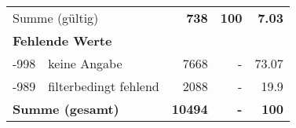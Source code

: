 \begin{longtable}{lXrrr}
     \midrule
     \multicolumn{2}{l}{Summe (gültig)} &
       \textbf{\num{738}} &
     \textbf{100} &
       \textbf{\num[round-mode=places,round-precision=2]{7,03}} \\
     \multicolumn{5}{l}{\textbf{Fehlende Werte}}\\
       -998 &
       keine Angabe &
         \num{7668} &
        - &
         \num[round-mode=places,round-precision=2]{73,07} \\
       -989 &
       filterbedingt fehlend &
         \num{2088} &
        - &
         \num[round-mode=places,round-precision=2]{19,9} \\
     \midrule
     \multicolumn{2}{l}{\textbf{Summe (gesamt)}} &
          \textbf{\num{10494}} &
        \textbf{-} &
        \textbf{100} \\
     \bottomrule
     \end{longtable}
     
